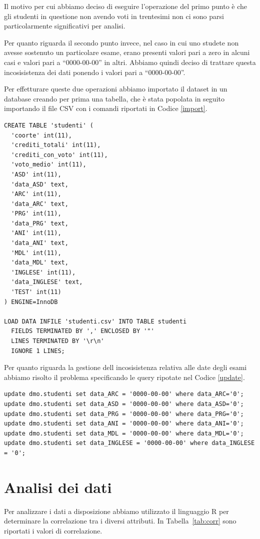 \documentclass[12pt]{article}
\begin{document}
Il motivo per cui abbiamo deciso di eseguire l'operazione del primo punto è che gli studenti in questione non avendo voti in trentesimi non ci sono parsi particolarmente significativi per analisi.

Per quanto riguarda il secondo punto invece, nel caso in cui uno stu\-dete non avesse sostenuto un particolare esame, erano presenti valori pari a zero in alcuni casi e valori pari a ``0000-00-00'' in altri.
Abbiamo quindi deciso di trattare questa incosisistenza dei dati ponendo i valori pari a ``0000-00-00''.

Per effetturare queste due operazioni abbiamo importato il dataset in un database creando per prima una tabella, che è stata popolata in seguito importando il file CSV con i comandi riportati in Codice \ref{import}.
\begin{lstlisting}[caption={Creazione della table}, style=sql, label={import}, captionpos=b]
CREATE TABLE 'studenti' (
  'coorte' int(11),
  'crediti_totali' int(11),
  'crediti_con_voto' int(11),
  'voto_medio' int(11),
  'ASD' int(11),
  'data_ASD' text,
  'ARC' int(11),
  'data_ARC' text,
  'PRG' int(11),
  'data_PRG' text,
  'ANI' int(11),
  'data_ANI' text,
  'MDL' int(11),
  'data_MDL' text,
  'INGLESE' int(11),
  'data_INGLESE' text,
  'TEST' int(11)
) ENGINE=InnoDB

LOAD DATA INFILE 'studenti.csv' INTO TABLE studenti
  FIELDS TERMINATED BY ',' ENCLOSED BY '"'
  LINES TERMINATED BY '\r\n'
  IGNORE 1 LINES;
\end{lstlisting}
\newpage
Per quanto riguarda la gestione dell incosisistenza relativa alle date degli esami abbiamo risolto il problema specificando le query ripotate nel Codice \ref{update}.
\begin{lstlisting}[caption={Update della tabella},style=sql, label={update},captionpos=b]
update dmo.studenti set data_ARC = '0000-00-00' where data_ARC='0'; 
update dmo.studenti set data_ASD = '0000-00-00' where data_ASD='0'; 
update dmo.studenti set data_PRG = '0000-00-00' where data_PRG='0'; 
update dmo.studenti set data_ANI = '0000-00-00' where data_ANI='0'; 
update dmo.studenti set data_MDL = '0000-00-00' where data_MDL='0';
update dmo.studenti set data_INGLESE = '0000-00-00' where data_INGLESE = '0';
\end{lstlisting}
\newpage
\section{Analisi dei dati}
Per analizzare i dati a disposizione abbiamo utilizzato il linguaggio R per determinare la correlazione tra i diversi attributi.
In Tabella~\ref{tab:corr} sono riportati i valori di correlazione.
\end{document}
